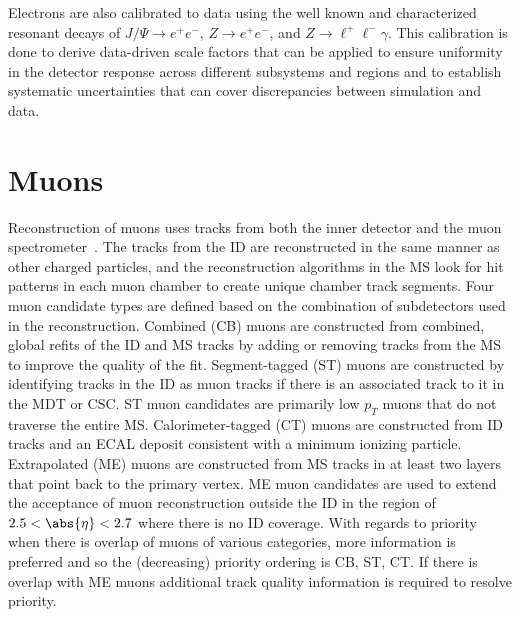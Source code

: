 Electrons are also calibrated to data using the well known and characterized resonant decays of $J/\Psi \to e^{+}e^{-}$, $Z \to e^{+}e^{-}$, and $Z \to \ell^{+}\ell^{-}\gamma$.
This calibration is done to derive data-driven scale factors that can be applied to ensure uniformity in the detector response across different subsystems and regions and to establish systematic uncertainties that can cover discrepancies between simulation and data.

\section{Muons}\label{section:muons}

Reconstruction of muons uses tracks from both the \gls{inner detector} and the \gls{muon spectrometer}~\cite{PERF-2015-10}.
The tracks from the ID are reconstructed in the same manner as other charged particles, and the reconstruction algorithms in the MS look for hit patterns in each muon chamber to create unique chamber track segments.
Four muon candidate types are defined based on the combination of subdetectors used in the reconstruction.
Combined (CB) muons are constructed from combined, global refits of the ID and MS tracks by adding or removing tracks from the MS to improve the quality of the fit.
Segment-tagged (ST) muons are constructed by identifying tracks in the ID as muon tracks if there is an associated track to it in the \gls{MDT} or \gls{CSC}.
ST muon candidates are primarily low $p_{T}$ muons that do not traverse the entire MS.
Calorimeter-tagged (CT) muons are constructed from ID tracks and an ECAL deposit consistent with a minimum ionizing particle.
Extrapolated (ME) muons are constructed from MS tracks in at least two layers that point back to the primary vertex.
ME muon candidates are used to extend the acceptance of muon reconstruction outside the ID in the region of $2.5 < \abs{\eta} < 2.7$ where there is no ID coverage.
With regards to priority when there is overlap of muons of various categories, more information is preferred and so the (decreasing) priority ordering is CB, ST, CT.
If there is overlap with ME muons additional track quality information is required to resolve priority.

